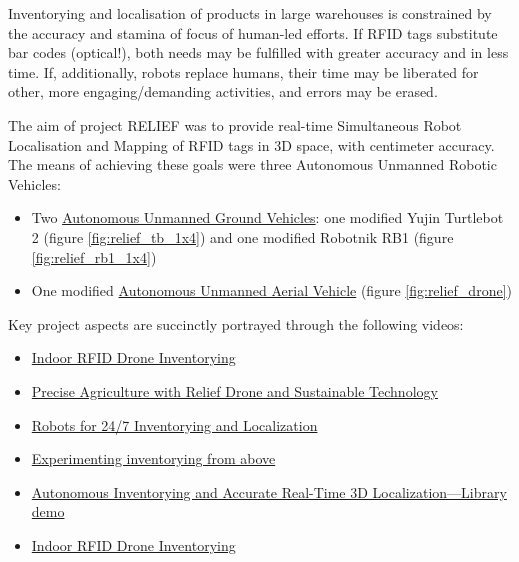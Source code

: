 
Inventorying and localisation of products in large warehouses is constrained by
the accuracy and stamina of focus of human-led efforts. If RFID tags substitute
bar codes (optical!), both needs may be fulfilled with greater accuracy and in
less time. If, additionally, robots replace humans, their time may be liberated
for other, more engaging/demanding activities, and errors may be erased.

The aim of project RELIEF was to provide real-time Simultaneous Robot
Localisation and Mapping of RFID tags in 3D space, with centimeter accuracy. The
means of achieving these goals were three Autonomous Unmanned Robotic Vehicles:

\begin{itemize}
  \item Two
        \href{https://www.youtube.com/watch?v=bo4lMI640DY}{Autonomous Unmanned Ground Vehicles}:
        one modified Yujin Turtlebot 2 (figure \ref{fig:relief_tb_1x4}) and one
        modified Robotnik RB1 (figure \ref{fig:relief_rb1_1x4})
  \item One modified
        \href{https://www.youtube.com/watch?v=9YpBIaO4tgY}{Autonomous Unmanned Aerial Vehicle}
        (figure \ref{fig:relief_drone})
\end{itemize}

Key project aspects are succinctly portrayed through the following videos:

\begin{itemize}
  \singlespacing
  \item \href{https://www.youtube.com/watch?v=9YpBIaO4tgY}{Indoor RFID Drone Inventorying }
  \item \href{https://www.facebook.com/watch/?v=1009958989425825}{Precise Agriculture with Relief Drone and Sustainable Technology}
  \item \href{https://www.facebook.com/watch/?v=960592754415188}{Robots for 24/7 Inventorying and Localization}
  \item \href{https://www.facebook.com/watch/?v=1183283855348186}{Experimenting inventorying from above}
  \item \href{https://www.youtube.com/watch?v=bo4lMI640DY}{Autonomous Inventorying and Accurate Real-Time 3D Localization---Library demo}
  \item \href{https://www.youtube.com/watch?v=9YpBIaO4tgY}{Indoor RFID Drone Inventorying}
\end{itemize}



